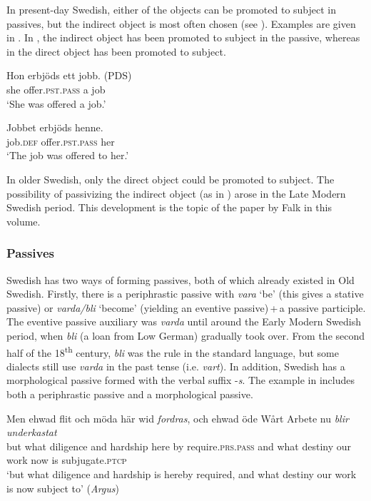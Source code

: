 \documentclass[output=paper]{langscibook}
\begin{document}
In present-day Swedish, either of the objects can be promoted to subject in passives, but the indirect object is most often chosen (see \citealt{Lundquist2004}). Examples are given in . In , the indirect object has been promoted to subject in the passive, whereas in  the direct object has been promoted to subject.


\ea\label{ex:intro:28}
\ea\label{ex:intro:28a}
\gll  Hon   erbjöds         ett jobb. (PDS)\\
she   offer\textsc{.pst.pass}   a    job\\
\glt ‘She was offered a job.’

\ex\label{ex:intro:28b}
\gll  Jobbet   erbjöds         henne. \\
  job.\textsc{def}     offer.\textsc{pst.pass} her\\
    \glt `The job was offered to her.’
\z
\z



In older Swedish, only the direct object could be promoted to subject. The possibility of passivizing the indirect object (as in ) arose in the Late Modern Swedish period. This development is the topic of the paper by Falk in this volume.


\subsubsection{Passives}\label{sec:intro:3.3.2}


Swedish has two ways of forming passives, both of which already existed in Old Swedish. Firstly, there is a periphrastic passive with \textit{vara} ‘be’ (this gives a stative passive) or \textit{varda/bli} ‘become’ (yielding an eventive passive)\,+\,a passive participle. The eventive passive auxiliary was \textit{varda} until around the Early Modern Swedish period, when \textit{bli} (a loan from Low German) gradually took over. From the second half of the 18\textsuperscript{th} century, \textit{bli} was the rule in the standard language, but some dialects still use \textit{varda} in the past tense (i.e. \textit{vart}). In addition, Swedish has a morphological passive formed with the verbal suffix -\textit{s}. The example in  includes both a periphrastic passive and a morphological passive.


\ea\label{ex:intro:29}
\gll  Men  ehwad   flit         och   möda     här     wid \textit{fordras}, och ehwad öde   Wårt   Arbete nu \textit{blir} \textit{underkastat}\\
but   what   diligence and   hardship   here   by    require\textsc{.prs.pass} and what  destiny our     work   now   is     subjugate\textsc{.ptcp}\\
\glt ‘but what diligence and hardship is hereby required, and what destiny our work is now subject to’ (\textit{Argus})
\z
\end{document}
